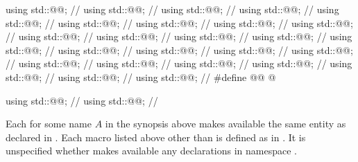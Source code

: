\begin{codeblock}
using std::@@;                          // \seebelow
using std::@@;                                  // \seebelow
using std::@@;                         // \seebelow
using std::@@;                                 // \seebelow
using std::@@;                        // \seebelow
using std::@@;                              // \seebelow
using std::@@;                     // \seebelow
using std::@@;               // \seebelow
using std::@@;      // \seebelow
using std::@@;                 // \seebelow
using std::@@;        // \seebelow
using std::@@;                             // \seebelow
using std::@@;                    // \seebelow
using std::@@;                             // \seebelow
using std::@@;                    // \seebelow
using std::@@;                             // \seebelow
using std::@@;                    // \seebelow
using std::@@;                              // \seebelow
using std::@@;                     // \seebelow
using std::@@;                             // \seebelow
using std::@@;                    // \seebelow
using std::@@;                     // \seebelow
using std::@@;            // \seebelow
using std::@@;                            // \seebelow
using std::@@;                   // \seebelow
#define @@ @\seebelow@

using std::@@;                          // \seebelow
using std::@@;                          // \seebelow
\end{codeblock}

\pnum
Each  for some name $A$ in the synopsis above
makes available the same entity as 
declared in .
Each macro listed above other than 
is defined as in .
It is unspecified whether  makes available
any declarations in namespace .

